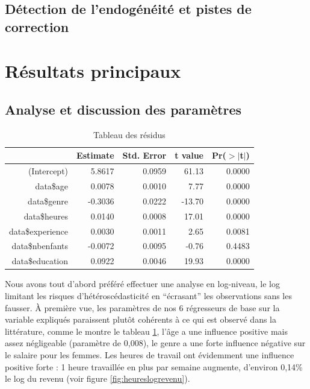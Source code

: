 \documentclass[a4paper, french, 11 pt]{article}\usepackage[]{graphicx}\usepackage[]{xcolor}
\begin{document}
\subsection{Détection de l’endogénéité et pistes de correction}

\section{Résultats principaux}

\subsection{Analyse et discussion des paramètres}

\begin{table}[ht]
\centering
\caption{Tableau des résidus} 
\label{tb:lm1}
\begin{tabular}{rrrrr}
  \toprule
 & Estimate & Std. Error & t value & Pr($>$$|$t$|$) \\ 
  \midrule
(Intercept) & 5.8617 & 0.0959 & 61.13 & 0.0000 \\ 
  data\$age & 0.0078 & 0.0010 & 7.77 & 0.0000 \\ 
  data\$genre & -0.3036 & 0.0222 & -13.70 & 0.0000 \\ 
  data\$heures & 0.0140 & 0.0008 & 17.01 & 0.0000 \\ 
  data\$experience & 0.0030 & 0.0011 & 2.65 & 0.0081 \\ 
  data\$nbenfants & -0.0072 & 0.0095 & -0.76 & 0.4483 \\ 
  data\$education & 0.0922 & 0.0046 & 19.93 & 0.0000 \\ 
   \bottomrule
\end{tabular}
\end{table}


Nous avons tout d’abord préféré effectuer une analyse en log-niveau, le log limitant les risques d’hétéroscédasticité en “écrasant” les observations sans les fausser. À première vue, les paramètres de nos 6 régresseurs de base sur la variable expliqués paraissent plutôt cohérents à ce qui est observé dans la littérature, comme le montre le tableau \ref{tb:lm1}, l’âge a une influence positive mais assez négligeable (paramètre de 0,008), le genre a une forte influence négative sur le salaire pour les femmes. Les heures de travail ont évidemment une influence positive forte : 1 heure travaillée en plus par semaine augmente, d’environ 0,14\% le log du revenu (voir figure \ref{fig:heureslogrevenu}).
\end{document}
